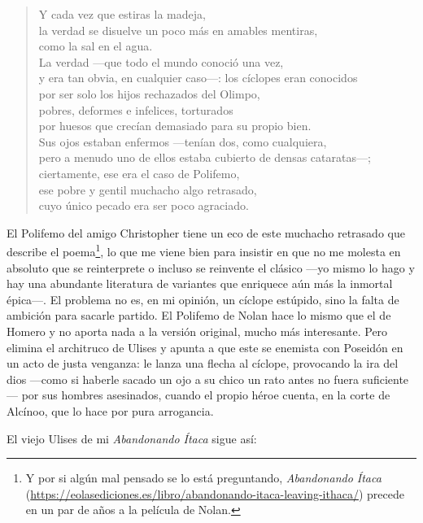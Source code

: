 \documentclass[11pt,a4paper]{article}
\begin{document}
\begin{verse}
Y cada vez que estiras la madeja,\\
la verdad se disuelve un poco más en amables mentiras,\\
como la sal en el agua.\\
La verdad ---que todo el mundo conoció una vez,\\
y era tan obvia, en cualquier caso---: los cíclopes eran conocidos\\
por ser solo los hijos rechazados del Olimpo,\\
pobres, deformes e infelices, torturados\\
por huesos que crecían demasiado para su propio bien.\\
Sus ojos estaban enfermos ---tenían dos, como cualquiera,\\
pero a menudo uno de ellos estaba cubierto de densas cataratas---;\\
ciertamente, ese era el caso de Polifemo,\\
ese pobre y gentil muchacho algo retrasado,\\
cuyo único pecado era ser poco agraciado.
\end{verse}

El Polifemo del amigo Christopher tiene un eco de este muchacho retrasado que describe el poema\footnote{Y por si algún mal pensado se lo está preguntando, \emph{Abandonando Ítaca} (\url{https://eolasediciones.es/libro/abandonando-itaca-leaving-ithaca/}) precede en un par de años a la película de Nolan.}, lo que me viene bien para insistir en que no me molesta en absoluto que se reinterprete o incluso se reinvente el clásico ---yo mismo lo hago y hay una abundante literatura de variantes que enriquece aún más la inmortal épica---. El problema no es, en mi opinión, un cíclope estúpido, sino la falta de ambición para sacarle partido. El Polifemo de Nolan hace lo mismo que el de Homero y no aporta nada a la versión original, mucho más interesante. Pero elimina el architruco de Ulises y apunta a que este se enemista con Poseidón en un acto de justa venganza: le lanza una flecha al cíclope, provocando la ira del dios ---como si haberle sacado un ojo a su chico un rato antes no fuera suficiente--- por sus hombres asesinados, cuando el propio héroe cuenta, en la corte de Alcínoo, que lo hace por pura arrogancia.

El viejo Ulises de mi \emph{Abandonando Ítaca} sigue así:
\end{document}
